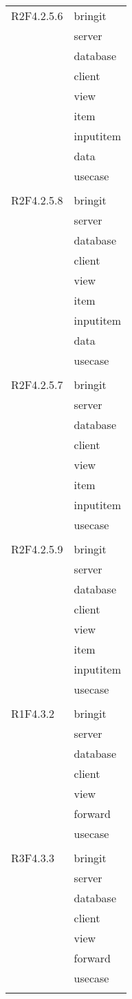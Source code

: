 \begin{center}
\begin{longtable}{|p{7cm}|p{7cm}|}
		R2F4.2.5.6 & bringit \\ & server \\ & database \\ & client \\ & view \\ & item \\ & inputitem \\ & data \\ & usecase \\ & \\ \hline
		R2F4.2.5.8 & bringit \\ & server \\ & database \\ & client \\ & view \\ & item \\ & inputitem \\ & data \\ & usecase \\ & \\ \hline
		R2F4.2.5.7 & bringit \\ & server \\ & database \\ & client \\ & view \\ & item \\ & inputitem \\ & usecase \\ & \\ \hline
		R2F4.2.5.9 & bringit \\ & server \\ & database \\ & client \\ & view \\ & item \\ & inputitem \\ & usecase \\ & \\ \hline
		R1F4.3.2 & bringit \\ & server \\ & database \\ & client \\ & view \\ & forward \\ & usecase \\ & \\ \hline
		R3F4.3.3 & bringit \\ & server \\ & database \\ & client \\ & view \\ & forward \\ & usecase \\ & \\ \hline

\end{longtable}
\end{center}
